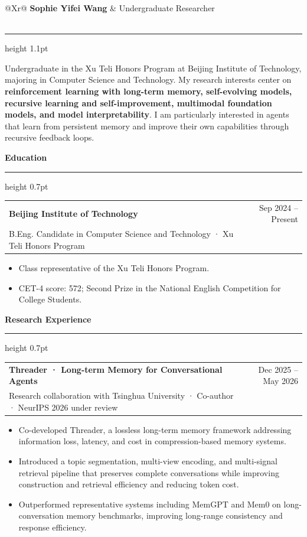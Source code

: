 \documentclass[10pt,a4paper]{article}
\makeatletter
\newcommand{\cvsection}[1]{%
  \vspace{0.72em}
  {\large\bfseries\color{Ink} #1}\par
  \vspace{0.22em}
  {\color{Rule}\hrule height 0.7pt}
  \vspace{0.36em}
}
\newcommand{\entryheading}[3]{%
  \begin{tabularx}{\textwidth}{@{}Xr@{}}
    {\bfseries\color{Ink} #1} & {\small\color{Muted} #3} \\
    {\small\color{Accent} #2} &
  \end{tabularx}
  \vspace{-0.28em}
}
\makeatother
\begin{document}
\color{Ink}
\sffamily

\begin{tabularx}{\textwidth}{@{}Xr@{}}
  {\fontsize{23}{27}\selectfont\bfseries Sophie Yifei Wang} &
  {\fontsize{14}{17}\selectfont\color{Muted} Undergraduate Researcher} \\
   \\
\end{tabularx}

\vspace{0.55em}
{\color{Rule}\hrule height 1.1pt}
\vspace{0.52em}

\justifying
Undergraduate in the Xu Teli Honors Program at Beijing Institute of Technology, majoring in Computer Science and Technology. My research interests center on \textbf{reinforcement learning with long-term memory, self-evolving models, recursive learning and self-improvement, multimodal foundation models, and model interpretability}. I am particularly interested in agents that learn from persistent memory and improve their own capabilities through recursive feedback loops.

\cvsection{Education}

\entryheading{Beijing Institute of Technology}{B.Eng. Candidate in Computer Science and Technology · Xu Teli Honors Program}{Sep 2024 -- Present}
\begin{itemize}
  \item Class representative of the Xu Teli Honors Program.
  \item CET-4 score: 572; Second Prize in the National English Competition for College Students.
\end{itemize}

\cvsection{Research Experience}

\entryheading{Threader · Long-term Memory for Conversational Agents}{Research collaboration with Tsinghua University · Co-author · NeurIPS 2026 under review}{Dec 2025 -- May 2026}
\begin{itemize}
  \item Co-developed Threader, a lossless long-term memory framework addressing information loss, latency, and cost in compression-based memory systems.
  \item Introduced a topic segmentation, multi-view encoding, and multi-signal retrieval pipeline that preserves complete conversations while improving construction and retrieval efficiency and reducing token cost.
  \item Outperformed representative systems including MemGPT and Mem0 on long-conversation memory benchmarks, improving long-range consistency and response efficiency.
\end{itemize}
\end{document}

